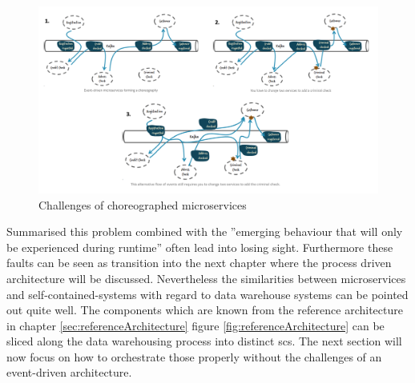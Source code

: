 \begin{figure}[!htb]
    \centering
    \includegraphics[scale=0.33]{pictures/FlowOfEvents.png}
    \caption{Challenges of choreographed microservices \cite{eventDrivenMicroservices}}
    \label{fig:chalengesChoreographedMicroservices}
\end{figure}

Summarised this problem combined with the ''emerging behaviour that will only be experienced during runtime''\cite{eventDrivenMicroservices} often lead into losing sight.\newline
Furthermore these faults can be seen as transition into the next chapter where the process driven architecture will be discussed. Nevertheless the similarities between microservices and self-contained-systems with regard to data warehouse systems can be pointed out quite well. The components which are known from the reference architecture in chapter \ref{sec:referenceArchitecture} figure \ref{fig:referenceArchitecture} can be sliced along the data warehousing process into distinct scs.\newline
The next section will now focus on how to orchestrate those properly without the challenges of an event-driven architecture. 